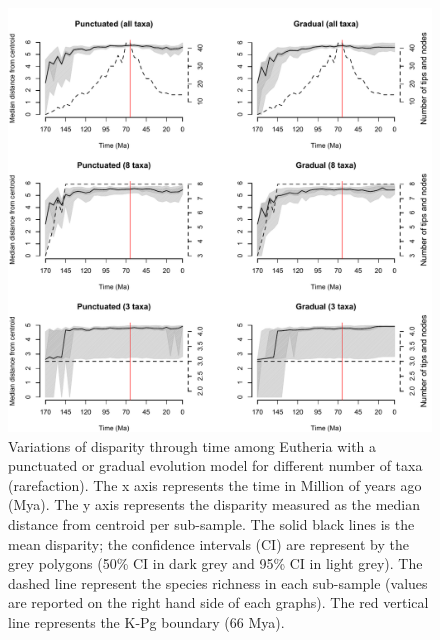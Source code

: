 \documentclass[12pt,letterpaper]{article}
\begin{document}
\begin{figure}[!h]
\centering
    \includegraphics[keepaspectratio=true]{Figures/Figure_S4.pdf}
\caption{\scriptsize{Variations of disparity through time among Eutheria with a punctuated or gradual evolution model for different number of taxa (rarefaction). The x axis represents the time in Million of years ago (Mya). The y axis represents the disparity measured as the median distance from centroid per sub-sample. The solid black lines is the mean disparity; the confidence intervals (CI) are represent by the grey polygons (50\% CI in dark grey and 95\% CI in light grey). The dashed line represent the species richness in each sub-sample (values are reported on the right hand side of each graphs). The red vertical line represents the K-Pg boundary (66 Mya).}}
\end{figure}
\end{document}
